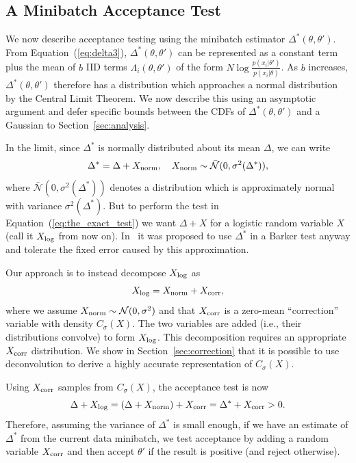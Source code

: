 \documentclass[twoside]{article} \usepackage{aistats2017}
\begin{document}
\subsection{A Minibatch Acceptance Test}\label{ssec:deltas_minibatch}

We now describe acceptance testing using the minibatch estimator
$\Delta^*(\theta,\theta')$. From Equation~(\ref{eq:delta3}),
$\Delta^*(\theta,\theta')$ can be represented as a constant term plus the mean
of $b$ IID terms $\Lambda_i(\theta,\theta')$ of the form
$N\log\frac{p(x_i|\theta')}{p(x_i|\theta)}$. As $b$ increases,
$\Delta^*(\theta,\theta')$ therefore has a distribution which approaches a
normal distribution by the Central Limit Theorem. We now describe this using an
asymptotic argument and defer specific bounds between the CDFs of
$\Delta^*(\theta,\theta')$ and a Gaussian to Section~\ref{sec:analysis}.

In the limit, since $\Delta^*$ is normally distributed about its mean $\Delta$,
we can write
\begin{equation}\label{eq:relationship}
    \Delta^* = \Delta + X_{\rm norm}, \quad X_{\rm norm} \sim \mathcal{\bar{N}}(0, \sigma^2(\Delta^*)),
\end{equation}
where $\mathcal{\bar{N}}(0, \sigma^2(\Delta^*))$ denotes a distribution which is
approximately normal with variance $\sigma^2(\Delta^*)$.  But to perform the
test in Equation~(\ref{eq:the_exact_test}) we want $\Delta + X$ for a logistic
random variable $X$ (call it $X_{\rm log}$ from now on). In~\citet{TallData15} it
was proposed to use $\Delta^*$ in a Barker test anyway and tolerate the fixed
error caused by this approximation. 

Our approach is to instead decompose $X_{\rm log}$ as
\begin{equation}\label{eq:deconvolution}
    X_{\rm log} = X_{\rm norm}+X_{\rm corr},
\end{equation}
where we assume $X_{\rm norm} \sim \mathcal{N}(0, \sigma^2)$ and that $X_{\rm
corr}$ is a zero-mean ``correction'' variable with density $C_{\sigma}(X)$.  The
two variables are added (i.e., their distributions convolve) to form $X_{\rm
log}$.  This decomposition requires an appropriate $X_{\rm corr}$ distribution.
We show in Section~\ref{sec:correction} that it is possible to use deconvolution
to derive a highly accurate representation of $C_{\sigma}(X)$.

Using $X_{\rm corr}$ samples from $C_{\sigma}(X)$, the acceptance test is now
\begin{equation}\label{eq:criteria}
    \Delta + X_{\rm log} = (\Delta + X_{\rm norm}) + X_{\rm corr} = \Delta^* + X_{\rm corr} >0.
\end{equation}
Therefore, assuming the variance of $\Delta^*$ is small enough, if we have an
estimate of $\Delta^*$ from the current data minibatch, we test acceptance by
adding a random variable $X_{\rm corr}$ and then accept $\theta'$ if the result
is positive (and reject otherwise).
\end{document}
